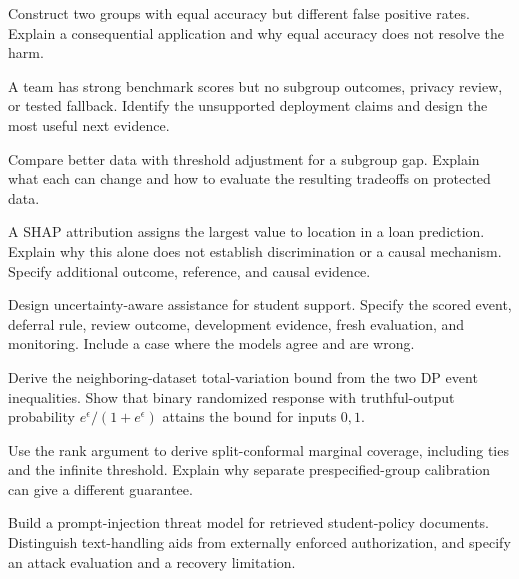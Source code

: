 \clearpage
\begin{challengeexercises}
\item {}Construct two groups with equal accuracy but different false positive rates. Explain a consequential application and why equal accuracy does not resolve the harm.
\item {}A team has strong benchmark scores but no subgroup outcomes, privacy review, or tested fallback. Identify the unsupported deployment claims and design the most useful next evidence.
\item {}Compare better data with threshold adjustment for a subgroup gap. Explain what each can change and how to evaluate the resulting tradeoffs on protected data.
\item {}A SHAP attribution assigns the largest value to location in a loan prediction. Explain why this alone does not establish discrimination or a causal mechanism. Specify additional outcome, reference, and causal evidence.
\item {}Design uncertainty-aware assistance for student support. Specify the scored event, deferral rule, review outcome, development evidence, fresh evaluation, and monitoring. Include a case where the models agree and are wrong.
\item {}Derive the neighboring-dataset total-variation bound from the two DP event inequalities. Show that binary randomized response with truthful-output probability $e^\epsilon/(1+e^\epsilon)$ attains the bound for inputs $0,1$.
\item {}Use the rank argument to derive split-conformal marginal coverage, including ties and the infinite threshold. Explain why separate prespecified-group calibration can give a different guarantee.
\item {}Build a prompt-injection threat model for retrieved student-policy documents. Distinguish text-handling aids from externally enforced authorization, and specify an attack evaluation and a recovery limitation.
\end{challengeexercises}

\clearpage
\begingroup\pagestyle{empty}\cleardoublepage\endgroup
\endgroup
